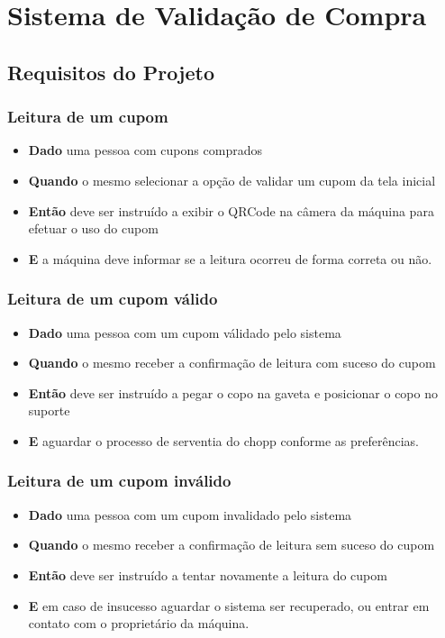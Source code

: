 \section[Sistema de Validação de Compra]{Sistema de Validação de Compra}
\subsection[Requisitos do Projeto]{Requisitos do Projeto}
\subsubsection[Leitura de um cupom]{Leitura de um cupom}
\begin{itemize}
    \item \textbf{Dado} uma pessoa com cupons comprados
    \item \textbf{Quando} o mesmo selecionar a opção de validar um cupom da tela inicial
    \item \textbf{Então} deve ser instruído a exibir o QRCode na câmera da máquina para
    efetuar o uso do cupom
    \item \textbf{E} a máquina deve informar se a leitura ocorreu de forma correta ou não.
\end{itemize}

\subsubsection[Leitura de um cupom válido]{Leitura de um cupom válido}
\begin{itemize}
    \item \textbf{Dado} uma pessoa com um cupom válidado pelo sistema
    \item \textbf{Quando} o mesmo receber a confirmação de leitura com suceso do cupom
    \item \textbf{Então} deve ser instruído a pegar o copo na gaveta e posicionar o copo
    no suporte
    \item \textbf{E} aguardar o processo de serventia do chopp conforme as preferências.
\end{itemize}

\subsubsection[Leitura de um cupom inválido]{Leitura de um cupom inválido}
\begin{itemize}
    \item \textbf{Dado} uma pessoa com um cupom invalidado pelo sistema
    \item \textbf{Quando} o mesmo receber a confirmação de leitura sem suceso do cupom
    \item \textbf{Então} deve ser instruído a tentar novamente a leitura do cupom
    \item \textbf{E} em caso de insucesso aguardar o sistema ser recuperado, ou entrar
    em contato com o proprietário da máquina.
\end{itemize}

